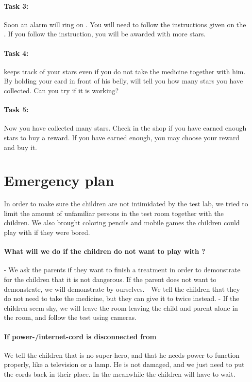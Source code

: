 {\paragraph{Task 3:}

Soon an alarm will ring on \app{}. You will need to follow the instructions given on the \app{}. If you follow the instruction, you will be awarded with more stars. 


\paragraph{Task 4:} 
\ab{} keeps track of your stars even if you do not take the medicine together with him. By holding your card in front of his belly, \ab{} will tell you how many stars you have collected. Can you try if it is working?


\paragraph{Task 5:}
Now you have collected many stars. Check in the shop if you have earned enough stars to buy a reward. If you have earned enough, you may choose your reward and buy it. 


\section{Emergency plan}
\label{sec:emergencyplan}
In order to make sure the children are not intimidated by the test lab, we tried to limit the amount of unfamiliar persons in the test room together with the children. We also brought coloring pencils and mobile games the children could play with if they were bored.  

\paragraph{What will we do if the children do not want to play with \ab{}?}
- We ask the parents if they want to finish a treatment in order to demonstrate for the children that it is not dangerous.
If the parent does not want to demonstrate, we will demonstrate by ourselves. 
- We tell the children that they do not need to take the medicine, but they can give it to \ab{} twice instead.
- If the children seem shy, we will leave the room leaving the child and parent alone in the room, and follow the test using cameras. 
 
\paragraph{If power-/internet-cord is disconnected from \ab{}}
We tell the children that \ab{} is no super-hero, and that he needs power to function properly, like a television or a lamp. He is not damaged, and we just need to put the cords back in their place. In the meanwhile the children will have to wait. 


}
